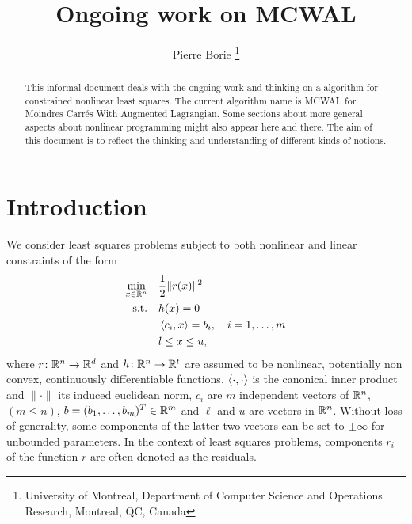 \documentclass[10pt]{article}
\numberwithin{equation}{section}
\newcommand{\footremember}[2]{%
	\footnote{#2}
	\newcounter{#1}
	\setcounter{#1}{\value{footnote}}%
}
\begin{document}
	
	
	\title{Ongoing work on MCWAL} %
	\author{Pierre Borie\footremember{1}{University of Montreal, Department of Computer Science and Operations Research, Montreal, QC, Canada}}
	\date{}
	
	
	
	\maketitle
	
	\begin{abstract}
		\noindent This informal document deals with the ongoing work and thinking on a algorithm for constrained nonlinear least squares. The current algorithm  name is MCWAL for Moindres Carr\'es With Augmented Lagrangian. Some sections about more general aspects about nonlinear programming might also appear here and there. The aim of this document is to reflect the thinking and understanding of different kinds of notions. 
	\end{abstract} %
	

	\section{Introduction}\label{sec:intro}
	
	We consider least squares problems subject to both nonlinear and linear constraints of the form
	\begin{equation}
		\label{eq:model_cnls}
		\begin{aligned}
			\min_{x\in {\mathbb{R}}^n} \quad & \dfrac{1}{2} \|r(x)\|^2 \\
			\text{s.t.} \quad & h(x) = 0 \\
			& \left\langle {c_i} , {x} \right\rangle = b_i,\quad i=1,\ldots,m \\
			& l \le x \le u,
		\end{aligned}
	\end{equation}
	where $r\colon {\mathbb{R}}^n \to {\mathbb{R}}^d$  and $h\colon {\mathbb{R}}^n \to {\mathbb{R}}^t$ are assumed to be nonlinear, potentially non convex, continuously differentiable functions, $\left\langle {\cdot} , {\cdot} \right\rangle$ is the canonical inner product and $\|\cdot\| $  its induced euclidean norm, $c_i$ are $m$  independent vectors of ${\mathbb{R}}^n$, $( m \le n)$, $b=(b_1,\ldots,b_m)^T \in {\mathbb{R}}^m$ and $\ell$ and $u$ are vectors in ${\mathbb{R}}^n$. Without loss of generality, some components of the latter two vectors can be set to $\pm \infty$ for unbounded parameters. In the context of least squares problems, components $r_i$ of the function $r$ are often denoted as the residuals.
	
\end{document}
